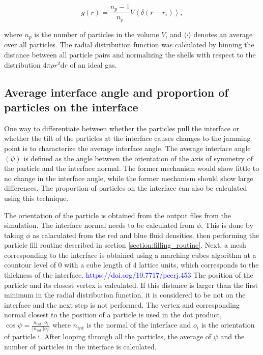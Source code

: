 \begin{equation}
    g(r) = \frac{n_p-1}{n_p} V \left\langle\delta\left(r-r_i\right)\right\rangle ,
\end{equation}

where \(n_p\) is the number of particles in the volume
\(V\), and \(\langle\cdot\rangle\) denotes an average over all
particles. The radial distribution function was calculated by binning
the distance between all particle pairs and normalizing the shells with
respect to the distribution \(4\pi \rho r^2 \mathrm{d}r\) of an ideal
gas. 

\subsection{Average interface angle and proportion of particles on the interface}
\label{section:interface_angle}

One way to differentiate between whether the particles pull the interface or whether the tilt of the particles at 
the interface causes changes to the jamming point is to characterize the average interface angle. The average interface 
angle $(\psi)$ is defined as the angle between the orientation of the axis of symmetry of the particle and the interface 
normal. The former mechanism would show little to no change in the interface angle, while the former mechanism should 
show large differences. The proportion of particles on the interface can also be calculated using this technique. 

The orientation of the particle is obtained from the output files from the simulation. The interface normal needs to 
be calculated from $\phi$. This is done by taking $\phi$ as calaculated from the red and blue fluid densities, then 
performing the particle fill routine described in section \ref{section:filling_routine}. Next, a mesh corresponding 
to the interface is obtained using a marching cubes algorithm at a countour level of 0 with a cube length of 4 lattice 
units, which corresponds to the thickness of the interface. \textcolor{blue}{https://doi.org/10.7717/peerj.453} The 
position of the particle and its closest vertex is calculated. If this distance is larger than the first minimum in 
the radial distribution function, it is considered to be not on the interface and the next step is not performed. The 
vertex and corresponding normal closest to the position of a particle is used in the dot product, 
$\cos{\psi} = \frac{n_{int} \cdot o_{i}}{|n_{int}| |o_i|}$ where $n_{int}$ is the normal of the interface and $o_i$ 
is the orientation of particle i. After looping through all the particles, the average of $\psi$ and the number of 
particles in the interface is calculated.

